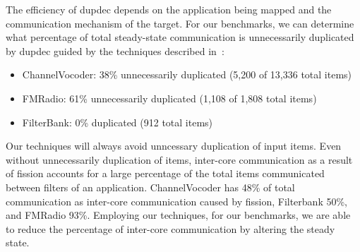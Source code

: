 The efficiency of dupdec depends on the application being mapped and
the communication mechanism of the target. For our benchmarks, we can
determine what percentage of total steady-state communication is
unnecessarily duplicated by dupdec guided by the techniques described
in~\cite{gordon-asplos06}:

\begin{itemize}
\item ChannelVocoder: 38\% unnecessarily duplicated (5,200 of 13,336
      total items)
\item FMRadio: 61\% unnecessarily duplicated (1,108 of
      1,808 total items) 
\item FilterBank: 0\% duplicated (912 total items)
\end{itemize}

Our techniques will always avoid unncessary duplication of input
items.  Even without unnecessarily duplication of items, inter-core
communication as a result of fission accounts for a large percentage
of the total items communicated between filters of an application.
ChannelVocoder has 48\% of total communication as inter-core
communication caused by fission, Filterbank 50\%, and FMRadio 93\%.
Employing our techniques, for our benchmarks, we are able to reduce
the percentage of inter-core communication by altering the steady
state.
